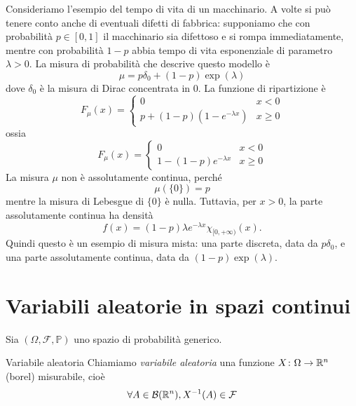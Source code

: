 \documentclass[a4paper]{article}
\begin{document}
\begin{snippetexample}{}
    Consideriamo l'esempio del tempo di vita di un macchinario.
    A volte si può tenere conto anche di eventuali difetti di fabbrica:
    supponiamo che con probabilità \(p \in [0,1]\) il macchinario sia difettoso
    e si rompa immediatamente, mentre con probabilità \(1-p\)
    abbia tempo di vita esponenziale di parametro \(\lambda > 0\).
    La misura di probabilità che descrive questo modello è
    \[
        \mu = p \delta_0 + (1-p)\operatorname{exp}(\lambda)
    \]
    dove \(\delta_0\) è la misura di Dirac concentrata in \(0\).
    La funzione di ripartizione è
    \[
        F_\mu(x)
        =
        \begin{cases}
            0 & x < 0 \\
            p + (1-p)(1 - e^{-\lambda x}) & x \geq 0
        \end{cases}
    \]
    ossia
    \[
        F_\mu(x)
        =
        \begin{cases}
            0 & x < 0 \\
            1 - (1-p)e^{-\lambda x} & x \geq 0
        \end{cases}
    \]
    La misura \(\mu\) non è assolutamente continua, perché
    \[
        \mu(\{0\}) = p
    \]
    mentre la misura di Lebesgue di \(\{0\}\) è nulla.
    Tuttavia, per \(x > 0\), la parte assolutamente continua ha densità
    \[
        f(x) = (1-p)\lambda e^{-\lambda x}\chi_{[0,+\infty)}(x).
    \]
    Quindi questo è un esempio di misura mista:
    una parte discreta, data da \(p\delta_0\), e una parte assolutamente continua,
    data da \((1-p)\operatorname{exp}(\lambda)\).
\end{snippetexample}

\pagebreak

\section{Variabili aleatorie in spazi continui}

Sia \((\Omega, \mathcal F, \mathbb P)\) uno spazio di probabilità generico.

\begin{snippetdefinition}{Variabile aleatoria}
    Chiamiamo \emph{variabile aleatoria}
    una funzione \(X \colon \Omega \to \mathbb{R}^n\) (borel) misurabile,
    cioè \[
        \forall A \in \mathcal B(\mathbb{R}^n),
        X^{-1}(A) \in \mathcal F
    \]
\end{snippetdefinition}
\end{document}
